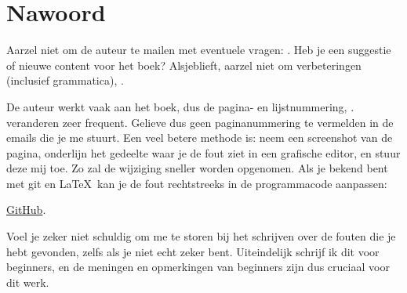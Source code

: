 \part*{Nawoord}

\chapterold{\NLph{}}

Aarzel niet om de auteur te mailen met eventuele vragen: \GTT{<\EMAIL>}.
Heb je een suggestie of nieuwe content voor het boek?
Alsjeblieft, aarzel niet om verbeteringen (inclusief grammatica), \etc.

De auteur werkt vaak aan het boek, dus de pagina- en lijstnummering, \etc. veranderen zeer frequent.
Gelieve dus geen paginanummering te vermelden in de emails die je me stuurt.
Een veel betere methode is: neem een screenshot van de pagina, onderlijn het gedeelte waar je de fout ziet in een grafische editor,
en stuur deze mij toe. Zo zal de wijziging sneller worden opgenomen.
Als je bekend bent met git en \LaTeX\, kan je de fout rechtstreeks in de programmacode aanpassen:

\href{http://go.yurichev.com/17089}{GitHub}.

Voel je zeker niet schuldig om me te storen bij het schrijven over de fouten die je hebt gevonden, zelfs als je niet echt zeker bent.
Uiteindelijk schrijf ik dit voor beginners, en de meningen en opmerkingen van beginners zijn dus cruciaal voor dit werk.

